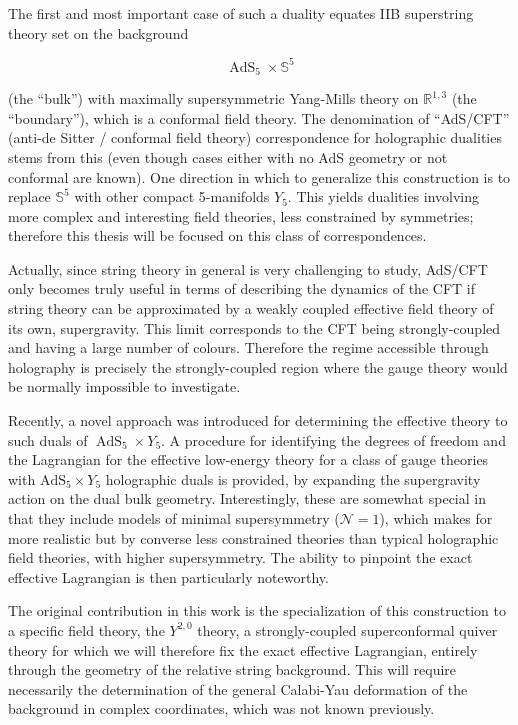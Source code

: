The first and most important case of such a duality\cite{Maldacena} equates IIB superstring theory set on the background

\begin{equation}
	\operatorname{AdS}_5 \times \mathbb{S}^5
\end{equation}

(the ``bulk'') with maximally supersymmetric Yang-Mills theory on $\mathbb{R}^{1,3}$ (the ``boundary''), which is a conformal field theory. The denomination of ``AdS/CFT'' (anti-de Sitter / conformal field theory) correspondence for holographic dualities stems from this (even though cases either with no AdS geometry or not conformal are known). One direction in which to generalize this construction is to replace $\mathbb{S}^5$ with other compact 5-manifolds $Y_5$. This yields dualities involving more complex and interesting field theories, less constrained by symmetries; therefore this thesis will be focused on this class of correspondences.

Actually, since string theory in general is very challenging to study, AdS/CFT only becomes truly useful in terms of describing the dynamics of the CFT if string theory can be approximated by a weakly coupled effective field theory of its own, supergravity. This limit corresponds to the CFT being strongly-coupled and having a large number of colours. Therefore the regime accessible through holography is precisely the strongly-coupled region where the gauge theory would be normally impossible to investigate.

Recently, a novel approach was introduced\cite{MZ} for determining the effective theory to such duals of $\operatorname{AdS}_5 \times Y_5$. A procedure for identifying the degrees of freedom and the Lagrangian for the effective low-energy theory for a class of gauge theories with $\operatorname{AdS_5} \times Y_5$ holographic duals is provided, by expanding the supergravity action on the dual bulk geometry. Interestingly, these are somewhat special in that they include models of minimal supersymmetry ($\mathcal{N}=1$), which makes for more realistic but by converse less constrained theories than typical holographic field theories, with higher supersymmetry. The ability to pinpoint the exact effective Lagrangian is then particularly noteworthy.

The original contribution in this work is the specialization of this construction to a specific field theory, the $Y^{2,0}$ theory, a strongly-coupled superconformal quiver theory for which we will therefore fix the exact effective Lagrangian, entirely through the geometry of the relative string background. This will require necessarily the determination of the general Calabi-Yau deformation of the background in complex coordinates, which was not known previously.

